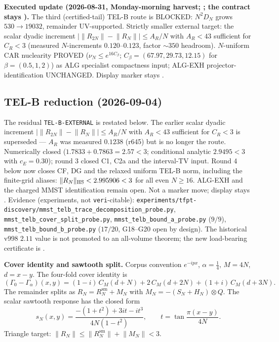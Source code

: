 \par\smallskip\noindent\textbf{Executed update (2026-08-31, Monday-morning harvest;
;
the contract stays \mO).}
The third (certified-tail) TEL-B route is BLOCKED: $N^2 D_N$ grows $530\to19032$,
remainder UV-supported.  Strictly smaller external target: the scalar dyadic increment
$\lvert\lVert R_{2N}\rVert-\lVert R_N\rVert\rvert\le A_R/N$ with $A_R<43$ sufficient for
$C_R<3$ (measured $N$-increments $0.120$--$0.123$, factor $\sim350$ headroom).  $N$-uniform
CAR nuclearity PROVED ($\nu_N\le e^{16 C_\beta}$; $C_\beta=(67.97,29.73,12.15)$ for
$\beta=(0.5,1,2)$) as ALG specialist compactness input; ALG-EXH projector-identification
UNCHANGED.  Display marker stays \mO.

\subsection*{TEL-B reduction (2026-09-04)}
\noindent The residual \texttt{TEL-B-EXTERNAL} is restated below.  The earlier scalar
dyadic increment $\lvert\lVert R_{2N}\rVert-\lVert R_N\rVert\rvert\le A_R/N$ with
$A_R<43$ sufficient for $C_R<3$ is superseded --- $A_R$ was measured $0.1238$ (r645)
but is no longer the route.  Numerically closed
($1.7833+0.7863=2.57<3$; conditional analytic $2.9495<3$ with $c_E=0.30$);
round 3 closed C1, C2a and the interval-TV input. Round 4 below now closes
CF, DG and the relaxed uniform TEL-B norm, including the finite-grid aliases:
$\|R_N\|_{\rm HS}<2.995906<3$ for all even $N\ge16$.
ALG-EXH and the charged MMST identification remain open.
Not a marker move; display stays \mO.
Evidence (experiments, not \texttt{veri}-citable):
\texttt{experiments/tfpt-discovery/mmst\_\allowbreak telb\_\allowbreak trace\_\allowbreak decomposition\_\allowbreak probe.py},
\texttt{mmst\_\allowbreak telb\_\allowbreak cover\_\allowbreak split\_\allowbreak probe.py},
\texttt{mmst\_\allowbreak telb\_\allowbreak bound\_\allowbreak a\_\allowbreak probe.py} ($9/9$),
\texttt{mmst\_\allowbreak telb\_\allowbreak bound\_\allowbreak b\_\allowbreak probe.py} ($17/20$, G18--G20 open by design).
The historical v998 $2.11$ value is not promoted to an all-volume theorem;
the new load-bearing certificate is
.

\par\smallskip\noindent\textbf{Cover identity and sawtooth split.}
Corpus convention $e^{-ipx}$, $\alpha=\tfrac14$, $M=4N$, $d=x-y$.  The four-fold
cover identity is
\begin{equation*}
  (\Gamma_0-\Gamma_\alpha)(x,y)
  =(1-i)\,C_M(d+N)+2\,C_M(d+2N)+(1+i)\,C_M(d+3N).
\end{equation*}
The remainder splits as $R_N=R_N^{\mathrm{sm}}+M_N$ with
$M_N=-(S_N+H_N)\otimes Q$.  The scalar sawtooth response has the closed form
\begin{equation*}
  s_N(x,y)=\frac{-(1+t^2)+3it-it^3}{4N(1-t^2)},\qquad
  t=\tan\frac{\pi(x-y)}{4N}.
\end{equation*}
Triangle target: $\lVert R_N\rVert\le\lVert R_N^{\mathrm{sm}}\rVert+\lVert M_N\rVert<3$.

